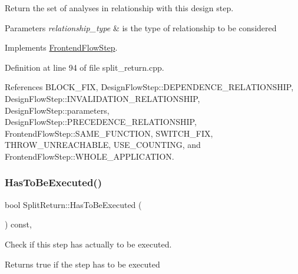 Return the set of analyses in relationship with this design step. 


\begin{DoxyParams}{Parameters}
{\em relationship\+\_\+type} & is the type of relationship to be considered \\
\hline
\end{DoxyParams}


Implements \hyperlink{classFrontendFlowStep_abeaff70b59734e462d347ed343dd700d}{Frontend\+Flow\+Step}.



Definition at line 94 of file split\+\_\+return.\+cpp.



References B\+L\+O\+C\+K\+\_\+\+F\+IX, Design\+Flow\+Step\+::\+D\+E\+P\+E\+N\+D\+E\+N\+C\+E\+\_\+\+R\+E\+L\+A\+T\+I\+O\+N\+S\+H\+IP, Design\+Flow\+Step\+::\+I\+N\+V\+A\+L\+I\+D\+A\+T\+I\+O\+N\+\_\+\+R\+E\+L\+A\+T\+I\+O\+N\+S\+H\+IP, Design\+Flow\+Step\+::parameters, Design\+Flow\+Step\+::\+P\+R\+E\+C\+E\+D\+E\+N\+C\+E\+\_\+\+R\+E\+L\+A\+T\+I\+O\+N\+S\+H\+IP, Frontend\+Flow\+Step\+::\+S\+A\+M\+E\+\_\+\+F\+U\+N\+C\+T\+I\+ON, S\+W\+I\+T\+C\+H\+\_\+\+F\+IX, T\+H\+R\+O\+W\+\_\+\+U\+N\+R\+E\+A\+C\+H\+A\+B\+LE, U\+S\+E\+\_\+\+C\+O\+U\+N\+T\+I\+NG, and Frontend\+Flow\+Step\+::\+W\+H\+O\+L\+E\+\_\+\+A\+P\+P\+L\+I\+C\+A\+T\+I\+ON.

\mbox{\label{classSplitReturn_a807a2c344e7d217d4164065e1e4e10da}} 
\subsubsection{\texorpdfstring{Has\+To\+Be\+Executed()}{HasToBeExecuted()}}
{\footnotesize\ttfamily bool Split\+Return\+::\+Has\+To\+Be\+Executed (\begin{DoxyParamCaption}{ }\end{DoxyParamCaption}) const\hspace{0.3cm}{\ttfamily [override]}, {\ttfamily [virtual]}}



Check if this step has actually to be executed. 

\begin{DoxyReturn}{Returns}
true if the step has to be executed 
\end{DoxyReturn}


